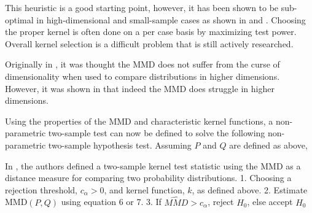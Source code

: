 This heuristic is a good starting point, however, it has been shown to be sub-optimal in high-dimensional and small-sample cases as shown in \cite{muandet2014kernel} and \cite{ramdas2015decreasing}. Choosing the proper kernel is often done on a per case basis by maximizing test power. Overall kernel selection is a difficult problem that is still actively researched.

Originally in \cite{gretton2012kernel}, it was thought the MMD does not suffer from the curse of dimensionality when used to compare distributions in higher dimensions. However, it was shown in \cite{ramdas2015decreasing} that indeed the MMD does struggle in higher dimensions.

\iffalse
\hl{REWORD: We call the function that achieves the supremum, the witness function because it is the function that witnesses the difference in the two distributions. This means that we can interpret the witness function as showing where the estimated densities of
p and q are most different.}

The witness function 
\begin{equation}
f(x)=\mathbb{E}_{x^{\prime} \sim p}\left[k\left(x, x^{\prime}\right)\right]-\mathbb{E}_{x^{\prime} \sim q}\left[k\left(x, x^{\prime}\right)\right]
\end{equation}

which can also be estimated from finite samples of data by:
\begin{equation}
\hat{f}(x)=\frac{1}{m} \sum_{i=1}^{m} k\left(x, x_{i}\right)-\frac{1}{n} \sum_{i=1}^{n} k\left(x, y_{i}\right)
\end{equation}
Thus, as [need citation] points at, the witness function tracks where the densities of $X$ and $Y$ are most different. 
Kernel selection is important because it decides the kind of witness functions that can be learned. For most applications it is simply set to the RBF kernel but ideally it should be selected based on maximizing test power.
\fi 
 
Using the properties of the MMD and characteristic kernel functions, a non-parametric two-sample test can now be defined to solve the following non-parametric two-sample hypothesis test. Assuming $P$ and $Q$ are defined as above, 


In \cite{gretton2012kernel}, the authors defined a two-sample kernel test statistic using the MMD as a distance measure for comparing two probability distributions. 
1. Choosing a rejection threshold, $c_\alpha > 0$, and kernel function, $k$, as defined above.
2. Estimate MMD$(P,Q)$ using equation 6 or 7.
3. If $\hat{MMD} > c_\alpha$, reject $H_0$, else accept $H_0$

